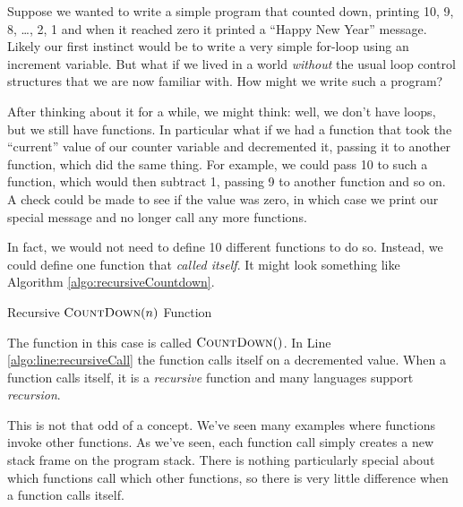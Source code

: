 

Suppose we wanted to write a simple program that counted down, printing
10, 9, 8, \ldots, 2, 1 and when it reached zero it printed a ``Happy
New Year'' message.  Likely our first instinct would be to write a 
very simple for-loop using an increment variable.  But what if we lived
in a world \emph{without} the usual loop control structures that we are now
familiar with.  How might we write such a program?

After thinking about it for a while, we might think: well, we don't have
loops, but we still have functions.  In particular what if we had a function
that took the ``current'' value of our counter variable and decremented it, 
passing it to another function, which did the same thing.  For example, we 
could pass 10 to such a function, which would then subtract 1, passing 9
to another function and so on.  A check could be made to see if the value was 
zero, in which case we print our special message and no longer call any more 
functions.

In fact, we would not need to define 10 different functions to do so.  Instead, 
we could define one function that \emph{called itself}.  It might look something
like Algorithm \ref{algo:recursiveCountdown}.

\begin{algorithm}[H]
 
\caption{Recursive $\textsc{CountDown}(n)$ Function}
\label{algo:recursiveCountdown}
\end{algorithm}

The function in this case is called $\textsc{CountDown}()$.  In Line 
\ref{algo:line:recursiveCall} the function calls itself on a decremented
value.  When a function calls itself, it is a \emph{recursive} function and
many languages support \emph{recursion}.

This is not that odd of a concept.  We've seen many examples where functions
invoke other functions.  As we've seen, each function call simply creates
a new stack frame on the program stack.  There is nothing particularly special
about which functions call which other functions, so there is very little
difference when a function calls itself. 

